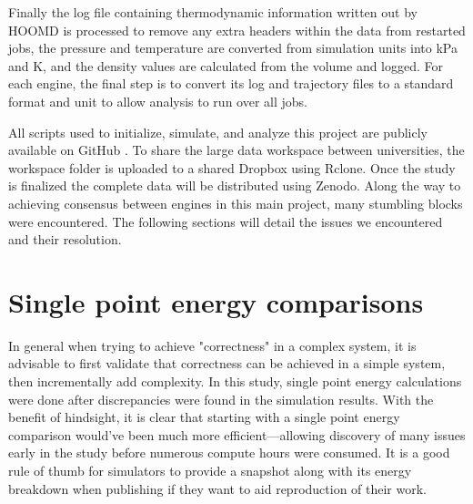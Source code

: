 Finally the log file containing thermodynamic information written out by HOOMD is processed to remove any extra headers within the data from restarted jobs, the pressure and temperature are converted from simulation units into kPa and K, and the density values are calculated from the volume and logged.
For each engine, the final step is to convert its log and trajectory files to a standard format and unit to allow analysis to run over all jobs.

All scripts used to initialize, simulate, and analyze this project are publicly available on GitHub \citep{reproducibility}.
To share the large data workspace between universities, the workspace folder is uploaded to a shared Dropbox using Rclone. 
Once the study is finalized the complete data will be distributed using Zenodo.
Along the way to achieving consensus between engines in this main project, many stumbling blocks were encountered. 
The following sections will detail the issues we encountered and their resolution.

\section{Single point energy comparisons}

In general when trying to achieve "correctness" in a complex system, it is advisable to first validate that correctness can be achieved in a simple system, then incrementally add complexity.
In this study, single point energy calculations were done after discrepancies were found in the simulation results.
With the benefit of hindsight, it is clear that starting with a single point energy comparison would've been much more efficient---allowing discovery of many issues early in the study before numerous compute hours were consumed. 
It is a good rule of thumb for simulators to provide a snapshot along with its energy breakdown when publishing if they want to aid reproduction of their work.

